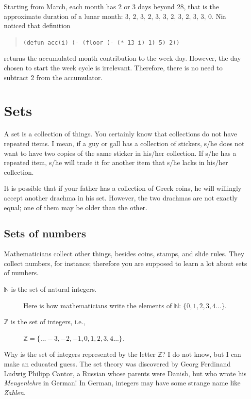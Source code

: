 \documentclass[a4paper,12pt]{book}
\begin{document}
Starting from March, each month has 2 or 3 days
beyond 28, that is the approximate duration of a
lunar month: 3, 2, 3, 2, 3, 3, 2, 3, 2, 3, 3, 0.
Nia noticed that definition
\begin{quote}
\verb|(defun acc(i) (- (floor (- (* 13 i) 1) 5) 2))|
\end{quote}
returns the accumulated month contribution
to the week day.
However, the day chosen to start
the week cycle is irrelevant. Therefore,
there is no need to subtract 2 from the
accumulator.

\chapter{Sets}
A set is a collection of things. You certainly know that
collections do not have repeated items. I mean, if a guy or gall has
a collection of stickers, s/he does not want to have two
copies of the same sticker in his/her collection. If s/he has a
repeated item, s/he will trade it for another item that s/he lacks
in his/her collection.


It is possible that if your father has a collection of Greek
coins, he will willingly accept another drachma in his set.
However, the two drachmas are not exactly equal; one of them may be older
than the other.

\section{Sets of numbers}
Mathematicians collect other things, besides
coins, stamps, and slide rules. They collect numbers, for instance;
therefore you are supposed to learn a lot about sets of numbers.
\begin{description}
\item[$\mathbb{N}$ is the set of natural integers.] Here is how mathematicians  write the
elements of $\mathbb{N}$: $\{0,1,2,3,4\ldots\}$.
\item[$\mathbb{Z}$ is the set of integers, i.e.,] $\mathbb{Z}=\{\ldots-3, -2, -1, 0, 1, 2, 3, 4\ldots\}$.
\end{description}


Why is the set of integers represented by the letter $\mathbb{Z}$? I do not know,
but I can make an educated guess. The set theory was discovered by Georg Ferdinand
Ludwig Philipp Cantor, a Russian whose parents were Danish, but who  wrote
his {\em Mengenlehre} in German! In German, integers may have some strange name like {\em Zahlen}.
\end{document}
